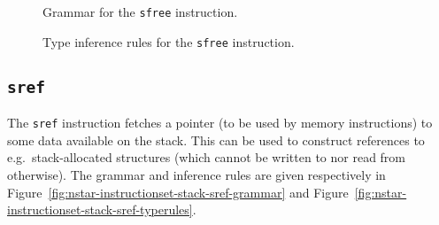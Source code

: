 \begin{figure}[H]
  \centering


  \caption{Grammar for the \texttt{sfree} instruction.}
  \label{fig:nstar-instructionset-stack-sfree-grammar}
\end{figure}

\begin{figure}[H]
  \centering


  \caption{Type inference rules for the \texttt{sfree} instruction.}
  \label{fig:nstar-instructionset-stack-sfree-typerules}
\end{figure}

\subsection{\texttt{sref}}\label{subsec:nstar-instructionset-stack-sref}

The \texttt{sref} instruction fetches a pointer (to be used by memory instructions) to some data available on the stack.
This can be used to construct references to e.g.\ stack-allocated structures (which cannot be written to nor read from otherwise).
The grammar and inference rules are given respectively in Figure~\ref{fig:nstar-instructionset-stack-sref-grammar} and Figure~\ref{fig:nstar-instructionset-stack-sref-typerules}.

